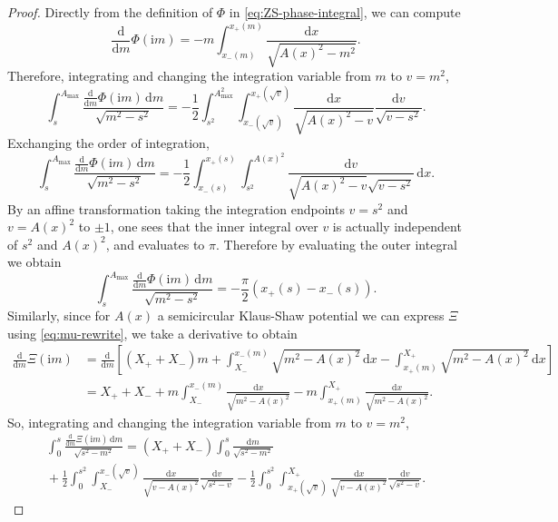 \documentclass[12pt]{amsart}
\numberwithin{equation}{section}
\newcommand{\dd}{\mathrm{d}}
\newcommand{\ii}{\mathrm{i}}
\newcommand{\phaseint}{\Phi}
\newcommand{\tailint}{\Xi}
\begin{document}
\begin{proof}
Directly from the definition of $\phaseint$ in \eqref{eq:ZS-phase-integral}, 
we can compute
\begin{equation}
\frac{\dd}{\dd m}\phaseint(\ii m) = -m\int_{x_-(m)}^{x_+(m)}\frac{\dd x}{\sqrt{A(x)^2-m^2}}.
\end{equation}
Therefore, integrating and changing the integration variable from $m$ to $v=m^2$,
\begin{equation}
\int_s^{A_\mathrm{max}}\frac{\displaystyle\frac{\dd}{\dd m}\phaseint(\ii m)\,\dd m}{\sqrt{m^2-s^2}} = 
-\frac{1}{2}\int_{s^2}^{A_\mathrm{max}^2}\int_{x_-(\sqrt{v})}^{x_+(\sqrt{v})}\frac{\dd x}{\sqrt{A(x)^2-v}}\frac{\dd v}{\sqrt{v-s^2}}.
\end{equation}
Exchanging the order of integration,
\begin{equation}
\int_s^{A_\mathrm{max}}\frac{\displaystyle\frac{\dd}{\dd m}\phaseint(\ii m)\,\dd m}{\sqrt{m^2-s^2}} = -\frac{1}{2}\int_{x_-(s)}^{x_+(s)}\int_{s^2}^{A(x)^2}\frac{\dd v}{\sqrt{A(x)^2-v}\sqrt{v-s^2}}\,\dd x.
\end{equation}
By an affine transformation taking the integration endpoints $v=s^2$ and $v=A(x)^2$ to $\pm 1$, one sees that the inner integral over $v$ is actually independent of $s^2$ and $A(x)^2$, and evaluates to $\pi$. 
Therefore by evaluating the outer integral we obtain
\begin{equation}
\int_s^{A_\mathrm{max}}\frac{\displaystyle\frac{\dd}{\dd m}\phaseint(\ii m)\,\dd m}{\sqrt{m^2-s^2}} = -\frac{\pi}{2}(x_+(s)-x_-(s)).
\label{eq:Psi-integral}
\end{equation}
Similarly, since for $A(x)$ a semicircular Klaus-Shaw potential we can express $\tailint$ using \eqref{eq:mu-rewrite},
we take a derivative to obtain
\begin{align}
\frac{\dd}{\dd m}\tailint(\ii m) &= \frac{\dd}{\dd m}\left[(X_++X_-)m + \int_{X_-}^{x_-(m)}\sqrt{m^2-A(x)^2}\,\dd x -\int_{x_+(m)}^{X_+}\sqrt{m^2-A(x)^2}\,\dd x\right] \nonumber \\
&= X_++X_- + m\int_{X_-}^{x_-(m)}\frac{\dd x}{\sqrt{m^2-A(x)^2}} -m\int_{x_+(m)}^{X_+}\frac{\dd x}{\sqrt{m^2-A(x)^2}}.
\end{align}
So, integrating and changing the integration variable from $m$ to $v=m^2$,
\begin{multline}
\int_0^s\frac{\displaystyle\frac{\dd}{\dd m}\tailint(\ii m)\,\dd m}{\sqrt{s^2-m^2}} = (X_++X_-)\int_0^s\frac{\dd m}{\sqrt{s^2-m^2}} \\
{}+\frac{1}{2}\int_0^{s^2}\int_{X_-}^{x_-(\sqrt{v})}\frac{\dd x}{\sqrt{v-A(x)^2}}\frac{\dd v}{\sqrt{s^2-v}} -\frac{1}{2}\int_0^{s^2}\int_{x_+(\sqrt{v})}^{X_+}\frac{\dd x}{\sqrt{v-A(x)^2}}\frac{\dd v}{\sqrt{s^2-v}}.

\end{multline}
\end{proof}
\end{document}
